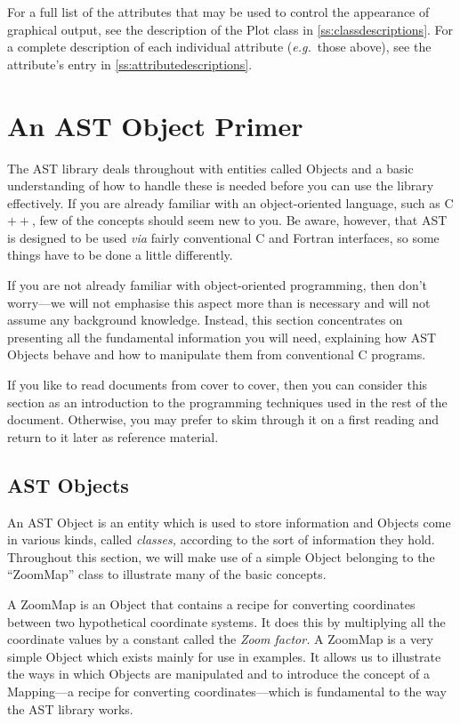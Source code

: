 \documentclass[twoside,11pt]{article}
\newcommand{\htmlref}[2]{#1}
\newcommand{\appref}[1]{Appendix~\ref{#1}}
\renewcommand{\appref}[1]{\ref{#1}}
\begin{document}
For a full list of the attributes that may be used to control the
appearance of graphical output, see the description of the Plot class
in \appref{ss:classdescriptions}. For a complete description of each
individual attribute ({\em{e.g.}}\ those above), see the attribute's
entry in \appref{ss:attributedescriptions}.

\cleardoublepage
\section{\label{ss:primer}An AST Object Primer}

The AST library deals throughout with entities called Objects and a
basic understanding of how to handle these is needed before you can
use the library effectively.  If you are already familiar with an
object-oriented language, such as C$++$, few of the concepts should
seem new to you.  Be aware, however, that AST is designed to be used
{\em{via}} fairly conventional C and Fortran interfaces, so some
things have to be done a little differently.

If you are not already familiar with object-oriented programming, then
don't worry---we will not emphasise this aspect more than is necessary
and will not assume any background knowledge.  Instead, this section
concentrates on presenting all the fundamental information you will
need, explaining how AST Objects behave and how to manipulate them
from conventional C programs.

If you like to read documents from cover to cover, then you can
consider this section as an introduction to the programming techniques
used in the rest of the document. Otherwise, you may prefer to skim
through it on a first reading and return to it later as reference
material.

\subsection{AST Objects}

An AST \htmlref{Object}{Object} is an entity which is used to store information and
Objects come in various kinds, called {\em{classes,}} according to the
sort of information they hold. Throughout this section, we will make
use of a simple Object belonging to the ``\htmlref{ZoomMap}{ZoomMap}'' class to
illustrate many of the basic concepts.

A ZoomMap is an Object that contains a recipe for converting
coordinates between two hypothetical coordinate systems.  It does this
by multiplying all the coordinate values by a constant called the
{\em{\htmlref{Zoom}{Zoom} factor.}}  A ZoomMap is a very simple Object which exists
mainly for use in examples. It allows us to illustrate the ways in
which Objects are manipulated and to introduce the concept of a
\htmlref{Mapping}{Mapping}---a recipe for converting coordinates---which is fundamental
to the way the AST library works.
\end{document}
